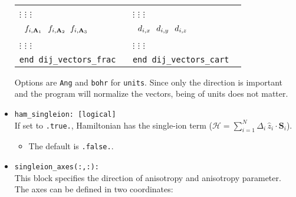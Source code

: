 \documentclass[10pt]{report}
\begin{document}
\begin{itemize}
\begin{center}
\begin{tabular}{p{0.4\linewidth}p{0.4\linewidth}}
                              \hspace{0.45cm} $\vdots$ \hspace{0.45cm} $\vdots$ \hspace{0.55cm} $\vdots$             &   
                              \hspace{0.45cm} $\vdots$ \hspace{0.55cm} $\vdots$ \hspace{0.4cm} $\vdots$ \\
        {\tt \hspace{0.2cm} $ f_{i,\textbf{A}_1} \hspace{0.25cm} f_{i,\textbf{A}_2} \hspace{0.2cm} f_{i,\textbf{A}_3} $}  &
        {\tt \hspace{0.2cm} $ d_{i,x} \hspace{0.25cm} d_{i,y} \hspace{0.25cm} d_{i,z}$} \\
                              \hspace{0.45cm} $\vdots$ \hspace{0.45cm} $\vdots$ \hspace{0.55cm} $\vdots$             &   
                              \hspace{0.45cm} $\vdots$ \hspace{0.55cm} $\vdots$ \hspace{0.4cm} $\vdots$ \\
        {\tt end dij\_vectors\_frac}    & {\tt end dij\_vectors\_cart} \\
        \bottomrule
    \end{tabular}
\end{center}
Options are {\tt Ang} and {\tt bohr} for {\tt units}. Since only the direction is important and 
the program will normalize the vectors, being of units does not matter. 
\item {\tt ham\_singleion: [logical]}                          \\
If set to {\tt .true.}, Hamiltonian has the single-ion term ($\mathcal{H}=\sum_{i=1}^{N}\Delta_i\,\hat{z}_i\cdot\textbf{S}_i$).
\begin{itemize} [label=\adfhalfrightarrowhead]
\item The default is {\tt .false.}.
\end{itemize}
\item {\tt singleion\_axes(:,:): }                   \\
This block specifies the direction of anisotropy and anisotropy parameter. The axes can be defined in two coordinates:

\end{itemize}
\end{document}
